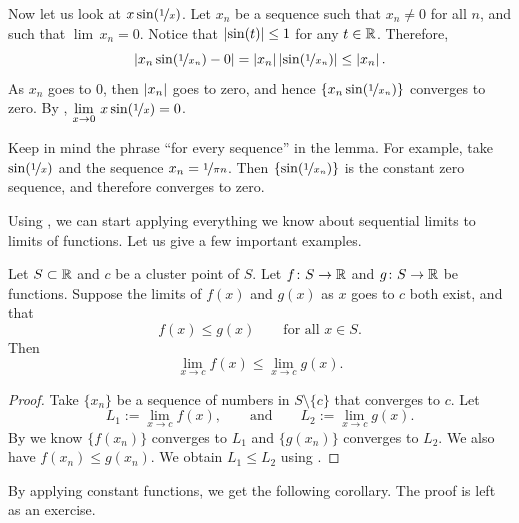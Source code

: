 \begin{example}
Now let us look at $x\sin(\nicefrac{1}{x})$.  Let $x_n$ be a sequence
such that $x_n \not= 0$ for all $n$, and such that $\lim\, x_n = 0$.
Notice that $\left\lvert {\sin(t)} \right\rvert \leq 1$ for any $t \in {\mathbb{R}}$.  Therefore,
\begin{equation*}
\left\lvert {x_n\sin(\nicefrac{1}{x_n})-0} \right\rvert
=
\left\lvert {x_n} \right\rvert\left\lvert {\sin(\nicefrac{1}{x_n})} \right\rvert
\leq
\left\lvert {x_n} \right\rvert .
\end{equation*}
As $x_n$ goes to 0, then $\left\lvert {x_n} \right\rvert$ goes to zero, and hence
$\{ x_n\sin(\nicefrac{1}{x_n}) \}$ converges to zero.  By
, 
$\displaystyle \lim_{x \to 0} \, x\sin( \nicefrac{1}{x} ) = 0$.
\end{example}

Keep in mind the phrase ``for every sequence'' in the lemma.
For example, take $\sin(\nicefrac{1}{x})$ and the sequence $x_n = \nicefrac{1}{\pi n}$.
Then $\{ \sin (\nicefrac{1}{x_n}) \}$ is the constant zero sequence, and
therefore converges to zero.

Using , 
we can start applying everything we know about
sequential limits to limits of functions.  Let us give a few important
examples.

\begin{cor}
Let $S \subset {\mathbb{R}}$ and $c$ be a cluster point of $S$.  Let $f \colon S \to
{\mathbb{R}}$ and $g \colon S \to {\mathbb{R}}$ be functions.
Suppose the limits of $f(x)$ and $g(x)$ as $x$ goes to $c$ both exist,
and that
\begin{equation*}
f(x) \leq g(x) \qquad \text{for all $x \in S$}.
\end{equation*}
Then
\begin{equation*}
\lim_{x\to c} f(x) \leq \lim_{x\to c} g(x) .
\end{equation*}
\end{cor}

\begin{proof}
Take $\{ x_n \}$ be a sequence of numbers in $S \setminus \{ c \}$
that converges to $c$.  Let
\begin{equation*}
L_1 := \lim_{x\to c} f(x), \qquad \text{and} \qquad L_2 := \lim_{x\to c} g(x) .
\end{equation*}
By  we know $\{ f(x_n) \}$ converges to
$L_1$ and $\{ g(x_n) \}$ converges to $L_2$.  We also
have $f(x_n) \leq g(x_n)$.
We obtain $L_1 \leq L_2$ using
.
\end{proof}

By applying constant functions, we get the following corollary.  The
proof is left as an exercise.

